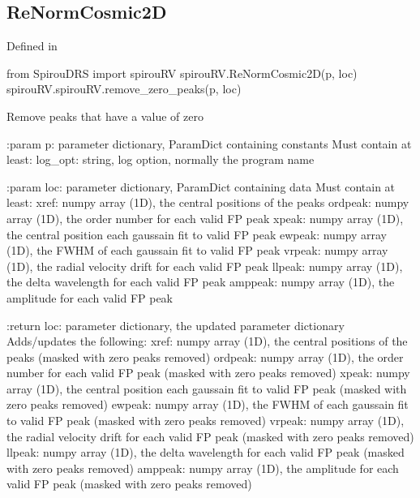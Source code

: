 \noindent\begin{minipage}{\textwidth}
\subsection{ReNormCosmic2D}

Defined in \spirouRV{}

\begin{pythonbox}
from SpirouDRS import spirouRV
spirouRV.ReNormCosmic2D(p, loc)
spirouRV.spirouRV.remove_zero_peaks(p, loc)
\end{pythonbox}

\begin{pythondocstring}
Remove peaks that have a value of zero

:param p: parameter dictionary, ParamDict containing constants
    Must contain at least:
            log_opt: string, log option, normally the program name

:param loc: parameter dictionary, ParamDict containing data
        Must contain at least:
            xref: numpy array (1D), the central positions of the peaks
            ordpeak: numpy array (1D), the order number for each valid FP
                     peak
            xpeak: numpy array (1D), the central position each gaussain fit
                   to valid FP peak
            ewpeak: numpy array (1D), the FWHM of each gaussain fit
                    to valid FP peak
            vrpeak: numpy array (1D), the radial velocity drift for each
                    valid FP peak
            llpeak: numpy array (1D), the delta wavelength for each valid
                    FP peak
            amppeak: numpy array (1D), the amplitude for each valid FP peak

:return loc: parameter dictionary, the updated parameter dictionary
        Adds/updates the following:
            xref: numpy array (1D), the central positions of the peaks
                  (masked with zero peaks removed)
            ordpeak: numpy array (1D), the order number for each valid FP
                     peak (masked with zero peaks removed)
            xpeak: numpy array (1D), the central position each gaussain fit
                   to valid FP peak (masked with zero peaks removed)
            ewpeak: numpy array (1D), the FWHM of each gaussain fit
                    to valid FP peak (masked with zero peaks removed)
            vrpeak: numpy array (1D), the radial velocity drift for each
                    valid FP peak (masked with zero peaks removed)
            llpeak: numpy array (1D), the delta wavelength for each valid
                    FP peak (masked with zero peaks removed)
            amppeak: numpy array (1D), the amplitude for each valid FP peak
                     (masked with zero peaks removed)
\end{pythondocstring}
\end{minipage}

